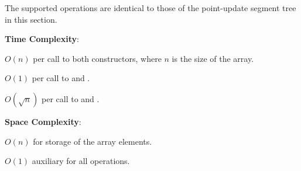 The supported operations are identical to those of the point-update segment tree in this section.

\textbf{Time Complexity}:
\begin{compactitem}
  \item $O(n)$ per call to both constructors, where $n$ is the size of the array.
  \item $O(1)$ per call to  and .
  \item $O(\sqrt{n})$ per call to  and .
\end{compactitem}

\textbf{Space Complexity}:
\begin{compactitem}
  \item $O(n)$ for storage of the array elements.
  \item $O(1)$ auxiliary for all operations.
\end{compactitem}

